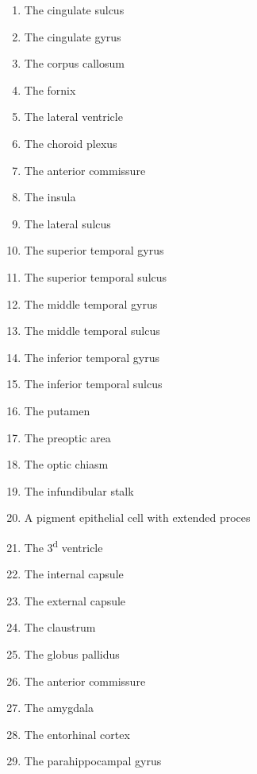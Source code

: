 \documentclass[]{book}
\providecommand{\tightlist}{%
  \setlength{\itemsep}{0pt}\setlength{\parskip}{0pt}}
\begin{document}
\begin{enumerate}
\def\labelenumi{\arabic{enumi}.}
\tightlist
\item
  The cingulate sulcus
\item
  The cingulate gyrus
\item
  The corpus callosum
\item
  The fornix
\item
  The lateral ventricle
\item
  The choroid plexus
\item
  The anterior commissure
\item
  The insula
\item
  The lateral sulcus
\item
  The superior temporal gyrus
\item
  The superior temporal sulcus
\item
  The middle temporal gyrus
\item
  The middle temporal sulcus
\item
  The inferior temporal gyrus
\item
  The inferior temporal sulcus
\item
  The putamen
\item
  The preoptic area
\item
  The optic chiasm
\item
  The infundibular stalk
\item
  A pigment epithelial cell with extended proces
\item
  The 3\textsuperscript{d} ventricle
\item
  The internal capsule
\item
  The external capsule
\item
  The claustrum
\item
  The globus pallidus
\item
  The anterior commissure
\item
  The amygdala
\item
  The entorhinal cortex
\item
  The parahippocampal gyrus
\end{enumerate}
\end{document}
